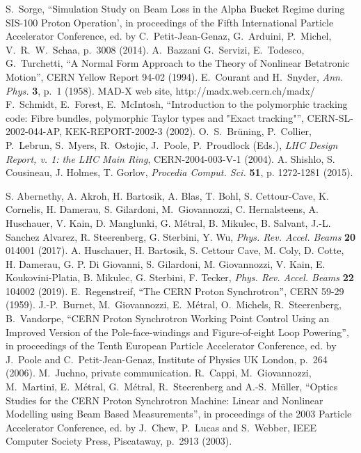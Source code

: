 \documentclass{article}
\begin{document}
\begin{thebibliography}{99}
%
 S.~Sorge, ``Simulation Study on Beam Loss in the Alpha Bucket Regime during SIS-100 Proton Operation', in proceedings of the Fifth International Particle Accelerator Conference, ed. by C.~Petit-Jean-Genaz, G.~Arduini, P.~Michel, V.~R.~W.~Schaa, p.~3008 (2014).
%
 A.~Bazzani G.~Servizi, E.~Todesco, G.~Turchetti,
``A Normal Form Approach to the Theory of Nonlinear Betatronic
Motion'', CERN Yellow Report 94-02 (1994).
%
 E.~Courant and H.~Snyder, {\sl Ann. Phys.} {\bf 3}, 
	p.~1 (1958).
%
 MAD-X web site, http://madx.web.cern.ch/madx/
%
 F.~Schmidt, E.~Forest, E.~McIntosh, ``Introduction to the polymorphic tracking code: Fibre bundles, polymorphic Taylor types and "Exact tracking"'', CERN-SL-2002-044-AP, KEK-REPORT-2002-3 (2002).
%
 O.~S.~Br\"uning, P.~Collier, P.~Lebrun, S.~Myers, 
R.~Ostojic, J.~Poole, P.~Proudlock (Eds.), {\sl LHC Design Report, 
v. 1: the LHC Main Ring}, CERN-2004-003-V-1 (2004).
%
 A. Shishlo, S. Cousineau, J. Holmes, T. Gorlov, {\sl Procedia Comput. Sci.} {\bf 51}, p. 1272-1281 (2015).

%
 S. Abernethy, A. Akroh, H. Bartosik, A. Blas, T. Bohl, S. Cettour-Cave, K. Cornelis, H. Damerau, S. Gilardoni, M.~Giovannozzi, C. Hernalsteens, A. Huschauer, V. Kain, D. Manglunki, G.  M\'etral, B. Mikulec, B. Salvant, J.-L. Sanchez Alvarez, R. Steerenberg, G. Sterbini, Y. Wu, {\sl Phys. Rev. Accel. Beams} {\bf 20} 014001 (2017).
%
 A. Huschauer, H. Bartosik, S. Cettour Cave, M. Coly, D. Cotte, H. Damerau, G. P. Di Giovanni, S. Gilardoni, M. Giovannozzi, V. Kain, E. Koukovini-Platia, B. Mikulec, G. Sterbini, F. Tecker, {\sl Phys. Rev. Accel. Beams} {\bf 22} 104002 (2019).
%
 E.~Regenstreif, ``The CERN Proton Synchrotron'', 
CERN 59-29 (1959). 
%
 J.-P.~Burnet, M.~Giovannozzi, E.~M\'etral, O.~Michels, R.~Steerenberg, B.~Vandorpe, ``CERN Proton Synchrotron Working Point Control Using an Improved Version of the Pole-face-windings and Figure-of-eight Loop Powering'', in proceedings of the Tenth European Particle Accelerator Conference, ed. by J.~Poole and C.~Petit-Jean-Genaz, Institute of Physics UK London, p.~264 (2006).
%
 M.~Juchno, private communication.
%
 R.~Cappi, M.~Giovannozzi, M.~Martini, E.~M\'etral, 
G.~M\'etral, R.~Steerenberg and A.-S.~M\"uller, ``Optics Studies for the 
CERN Proton Synchrotron Machine: Linear and Nonlinear Modelling using Beam 
Based Measurements'', in proceedings of the 2003 Particle Accelerator Conference, ed. by 
J.~Chew, P.~Lucas and S.~Webber, IEEE Computer Society Press, 
Piscataway, p.~2913 (2003).
%
\end{thebibliography}
%
\clearpage
%
\appendix
%
\end{document}
